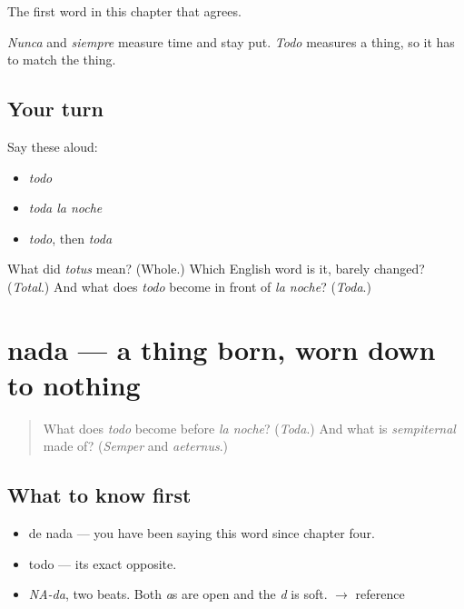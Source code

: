\begin{grammarlens}[title={What you've built}]
The first word in this chapter that agrees.

\emph{Nunca} and \emph{siempre} measure time and stay put. \emph{Todo} measures a thing, so it has to match the thing.
\end{grammarlens}

\subsection*{Your turn}
Say these aloud:

\begin{itemize}
\raggedright
  \item \emph{todo}
  \item \emph{toda la noche}
  \item \emph{todo}, then \emph{toda}
\end{itemize}

\begin{tcolorbox}[breakable,colback=teal!4,colframe=teal!35!black,title={Before you move on}]
What did \emph{totus} mean? (Whole.) Which English word is it, barely changed? (\emph{Total}.) And what does \emph{todo} become in front of \emph{la noche}? (\emph{Toda}.)
\end{tcolorbox}
\section[nada]{nada — a thing born, worn down to nothing}

\label{lesson:ES-C316-nada}



\begin{quote}
What does \emph{todo} become before \emph{la noche}? (\emph{Toda}.) And what is \emph{sempiternal} made of? (\emph{Semper} and \emph{aeternus}.)
\end{quote}

\subsection*{What to know first}
\begin{itemize}
\raggedright
  \item de nada — you have been saying this word since chapter four.
  \item todo — its exact opposite.
\end{itemize}

\begin{sounds}
\begin{itemize}
\raggedright
  \item \emph{NA-da}, two beats. Both \emph{a}s are open and the \emph{d} is soft. $\to$ reference
\end{itemize}
\end{sounds}

